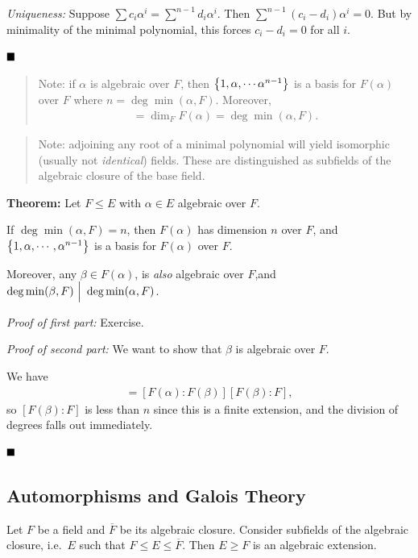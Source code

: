 \emph{Uniqueness:} Suppose
\(\sum c_i \alpha^i = \sum^{n-1} d_i \alpha^i\). Then
\(\sum^{n-1} (c_i - d_i) \alpha^i = 0\). But by minimality of the
minimal polynomial, this forces \(c_i - d_i = 0\) for all \(i\).

\(\qed\)

\begin{quote}
Note: if \(\alpha\) is algebraic over \(F\), then
\(\left\{{1, \alpha, \cdots \alpha^{n-1}}\right\}\) is a basis for \(F(\alpha)\)
over \(F\) where \(n = \deg \min(\alpha, F)\). Moreover,
\begin{align*}
[F(\alpha):F] = \dim_F F(\alpha) = \deg\min(\alpha, F)
.\end{align*}
\end{quote}

\begin{quote}
Note: adjoining any root of a minimal polynomial will yield isomorphic
(usually not \emph{identical}) fields. These are distinguished as
subfields of the algebraic closure of the base field.
\end{quote}

\textbf{Theorem:} Let \(F \leq E\) with \(\alpha \in E\) algebraic over
\(F\).

If \(\deg\min(\alpha, F) = n\), then \(F(\alpha)\) has dimension \(n\)
over \(F\), and \(\left\{{1, \alpha, \cdots, \alpha^{n-1}}\right\}\) is a basis
for \(F(\alpha)\) over \(F\).

Moreover, any \(\beta \in F(\alpha)\), is \emph{also} algebraic over
\(F\),and \(\deg\min(\beta, F) {~\Bigm| ~} \deg \min(\alpha, F)\).

\emph{Proof of first part:} Exercise.

\emph{Proof of second part:} We want to show that \(\beta\) is algebraic
over \(F\).

We have
\begin{align*}
[F(\alpha):F] = [F(\alpha): F(\beta)][F(\beta): F]
,\end{align*} so \([F(\beta) : F]\) is less than \(n\) since this is a
finite extension, and the division of degrees falls out immediately.

\(\qed\)

\hypertarget{automorphisms-and-galois-theory}{%
\subsection{Automorphisms and Galois
Theory}\label{automorphisms-and-galois-theory}}

Let \(F\) be a field and \(\overline F\) be its algebraic closure.
Consider subfields of the algebraic closure, i.e.~\(E\) such that
\(F \leq E \leq \overline F\). Then \(E \geq F\) is an algebraic
extension.


